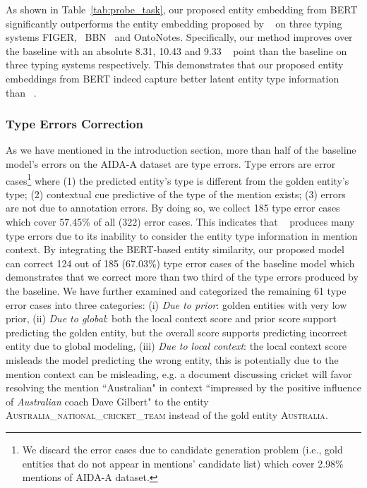 \documentclass[letterpaper]{article} \usepackage{aaai20}  \usepackage{times}  \usepackage{helvet} \usepackage{courier}  \usepackage[hyphens]{url}  \usepackage{graphicx} \urlstyle{rm} \def\UrlFont{\rm}  \usepackage{graphicx}  \frenchspacing  \setlength{\pdfpagewidth}{8.5in}  \setlength{\pdfpageheight}{11in}  \usepackage{multirow}
\newcommand{\namecite}[1]{\citeauthor{#1}~\shortcite{#1}}
\newcommand{\figer}{{FIGER}}
\newcommand{\bbn}{{BBN}}
\newcommand{\ontonotesFine}{OntoNotes}
\newcommand{\fOneMi}{}
\begin{document}
As shown in Table~\ref{tab:probe_task}, our proposed entity embedding from BERT significantly outperforms the entity embedding proposed by \namecite{ganea2017deep} on three typing systems \figer, ~\bbn ~ and \ontonotesFine. Specifically, our method improves over the baseline with an absolute 8.31, 10.43 and 9.33 \fOneMi ~ point than the baseline on three typing systems respectively. This demonstrates that our proposed entity embeddings from BERT indeed capture better latent entity type information than \namecite{ganea2017deep}.

\subsubsection{Type Errors Correction}

As we have mentioned in the introduction section, more than half of the baseline model's errors on the AIDA-A dataset are type errors. Type errors are error cases\footnote{We discard the error cases due to candidate generation problem (i.e., gold entities that do not appear in mentions' candidate list) which cover 2.98\% mentions of AIDA-A dataset.} where (1) the predicted entity's type is different from the golden entity's type; (2) contextual cue predictive of the type of the mention exists; (3) errors are not due to annotation errors. By doing so, we collect 185 type error cases which cover 57.45\% of all (322) error cases. This indicates that \namecite{ganea2017deep} produces many type errors due to its inability to consider the entity type information in mention context. By integrating the BERT-based entity similarity, our proposed model can correct 124 out of 185 (67.03\%) type error cases of the baseline model which demonstrates that we correct more than two third of the type errors produced by the baseline. We have further examined and categorized the remaining 61 type error cases into three categories: (i) {\em Due to prior}: golden entities with very low  prior, (ii) {\em Due to global}: both the local context score and prior score support predicting the golden entity, but the overall score supports predicting incorrect entity due to global modeling, (iii) {\em Due to local context}: the local context score misleads the model predicting the wrong entity, this is potentially due to the mention context can be misleading, e.g. a document discussing cricket will favor resolving the mention ``Australian" in context ``impressed by the positive influence of {\em Australian} coach Dave Gilbert" to the entity \textsc{Australia\_national\_cricket\_team} instead of the gold entity \textsc{Australia}. 
\end{document}
